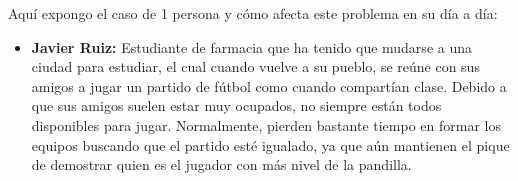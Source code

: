 Aquí expongo el caso de 1 persona y cómo afecta este problema en su día a día:

\begin{itemize}
    \item \textbf{Javier Ruiz:} Estudiante de farmacia que ha tenido que mudarse a una ciudad para estudiar, el cual cuando vuelve a su pueblo,
     se reúne con sus amigos a jugar un partido de fútbol como cuando compartían clase. Debido a que sus amigos suelen estar muy ocupados,
     no siempre están todos disponibles para jugar. Normalmente, pierden bastante tiempo en formar los equipos buscando que el partido esté igualado,
     ya que aún mantienen el pique de demostrar quien es el jugador con más nivel de la pandilla. 
\end{itemize}
